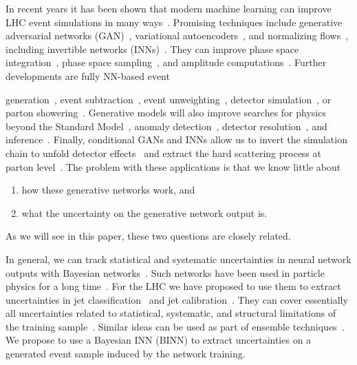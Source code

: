 In recent years it has been shown that modern machine learning can
improve LHC event simulations in many
ways~\cite{Butter:2020tvl}. Promising techniques include generative
adversarial networks
(GAN)~\cite{goodfellow2014generative,Creswell2018,Butter:2020qhk},
variational autoencoders~\cite{kingma2014autoencoding,Kingma2019}, and
normalizing
flows~\cite{nflow1,Kobyzev_2020,papamakarios2019normalizing,nflow_review,mller2018neural},
including invertible networks (INNs)~\cite{inn,coupling2,glow}. They
can improve phase space integration~\cite{maxim,Chen:2020nfb}, phase
space sampling~\cite{Bothmann:2020ywa,Gao:2020vdv,Gao:2020zvv}, and
amplitude computations~\cite{Bishara:2019iwh,Badger:2020uow}.  Further
developments are fully NN-based event

generation~\cite{dutch,gan_datasets,DijetGAN2,gan_phasespace,Alanazi:2020klf},
event subtraction~\cite{Butter:2019eyo}, event
unweighting~\cite{Verheyen:2020bjw,Backes:2020vka}, detector
simulation~\cite{calogan1,calogan2,fast_accurate,aachen_wgan1,aachen_wgan2,ATLASShowerGAN,ATLASsimGAN,Belayneh:2019vyx,Buhmann:2020pmy,Buhmann:2021lxj},
or parton
showering~\cite{shower,locationGAN,monkshower,juniprshower,Dohi:2020eda}.
Generative models will also improve searches for physics beyond the
Standard Model~\cite{bsm_gan}, anomaly
detection~\cite{Nachman:2020lpy,Knapp:2020dde}, detector
resolution~\cite{DiBello:2020bas,Baldi:2020hjm}, and
inference~\cite{Brehmer:2020vwc,radev2020bayesflow,Bieringer:2020tnw}. Finally,
conditional GANs and INNs allow us to invert the simulation chain to
unfold detector effects~\cite{Datta:2018mwd,fcgan} and extract the
hard scattering process at parton level~\cite{Bellagente:2020piv}. The
problem with these applications is that we know little about
%
\begin{enumerate}
\item how these generative networks work, and
\item what the uncertainty on the generative network output is.
\end{enumerate}
%
As we will see in this paper, these two questions are closely related.

In general, we can track statistical and systematic uncertainties in
neural network outputs with Bayesian
networks~\cite{bnn_early,bnn_early2,bnn_early3,deep_errors}. Such
networks have been used in particle physics for a long
time~\cite{bnn_tev,bnn_tev2,bnn_Nu}. For the LHC we have proposed to
use them to extract uncertainties in jet
classification~\cite{Bollweg:2019skg} and jet
calibration~\cite{Kasieczka:2020vlh}. They can cover essentially all
uncertainties related to statistical, systematic, and structural
limitations of the training sample~\cite{Nachman:2019dol}.  Similar
ideas can be used as part of ensemble techniques~\cite{Araz:2021wqm}.
We propose to use a Bayesian INN (BINN) to extract uncertainties on a
generated event sample induced by the network training.

